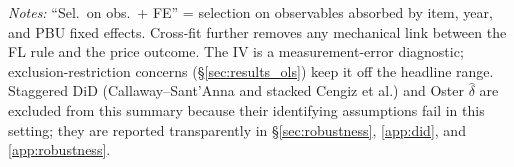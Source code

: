 \begin{table}[htbp]
\begin{tabular}{lcccll}
\hline\hline
\end{tabular}
\begin{tablenotes}
\small
\item \textit{Notes:} ``Sel.\ on obs.\ + FE'' = selection on observables absorbed by item, year, and PBU fixed effects. Cross-fit further removes any mechanical link between the FL rule and the price outcome. The IV is a measurement-error diagnostic; exclusion-restriction concerns (\S\ref{sec:results_ols}) keep it off the headline range. Staggered DiD (Callaway--Sant'Anna and stacked Cengiz et al.) and Oster $\hat{\delta}$ are excluded from this summary because their identifying assumptions fail in this setting; they are reported transparently in \S\ref{sec:robustness}, \ref{app:did}, and \ref{app:robustness}.
\end{tablenotes}
\end{table}
